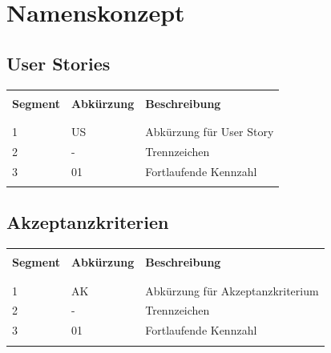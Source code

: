 \section{Namenskonzept}
\subsection{User Stories}
\begin{table}[htp]
  \begin{tabularx}{\textwidth}{l l X}\hline \\
  \textbf{Segment} & \textbf{Abkürzung} & \textbf{Beschreibung} \\ \\\hline \\
  1 & US & Abkürzung für User Story \\
  2 & - & Trennzeichen \\
  3 & 01 & Fortlaufende Kennzahl \\
  \\\hline
  \end{tabularx}
\end{table}
\subsection{Akzeptanzkriterien}
\begin{table}[htp]
  \begin{tabularx}{\textwidth}{l l X}\hline \\
  \textbf{Segment} & \textbf{Abkürzung} & \textbf{Beschreibung} \\ \\\hline \\
  1 & AK & Abkürzung für Akzeptanzkriterium \\
  2 & - & Trennzeichen \\
  3 & 01 & Fortlaufende Kennzahl \\
  \\\hline
  \end{tabularx}
\end{table}
